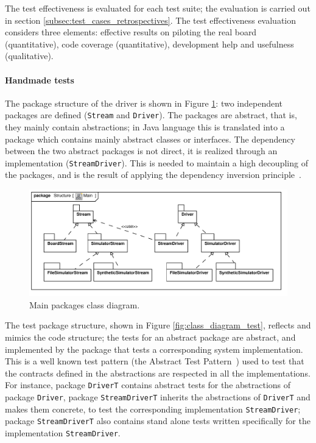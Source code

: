 \documentclass[english]{lni}
\newcommand{\lil}[1]{\texttt{\lstinline|#1|}}
\begin{document}
The test effectiveness is evaluated for each test suite; the evaluation is carried out in section \ref{subsec:test_cases_retrospectives}.
The test effectiveness evaluation considers three elements: effective results on piloting the real board (quantitative), code coverage
(quantitative), development help and usefulness (qualitative).

\paragraph*{Handmade tests}

The package structure of the driver is shown in Figure \ref{fig:class_diagram_main}: two independent packages are defined (\lil{Stream} and \lil{Driver}).  
The packages are abstract, that is, they mainly contain abstractions; in Java language this is translated into a package which contains mainly abstract classes or interfaces.  
The dependency between the two abstract packages is not direct, it is realized through an implementation (\lil{StreamDriver}).
This is needed to maintain a high decoupling of the packages, and is the result of applying the dependency inversion principle~\cite{Martin1996}.

\begin{figure}[htb!]
  \centering
  \includegraphics[scale=0.6]{UML_model/Class_Diagram__Structure__Main}
  \caption{Main packages class diagram.}
  \label{fig:class_diagram_main}
\end{figure}

The test package structure, shown in Figure \ref{fig:class_diagram_test}, reflects and mimics the code structure; the tests for an abstract package are abstract, and implemented by the package that tests a corresponding system implementation. 
This is a well known test pattern (the Abstract Test Pattern~\cite{Thomas2004}) used to test that the contracts defined in the abstractions are respected in all the implementations.  
For instance, package \lil{DriverT} contains abstract tests for the abstractions of package \lil{Driver}, package \lil{StreamDriverT} inherits the abstractions of \lil{DriverT} and makes them concrete, to test the corresponding implementation \lil{StreamDriver}; package \lil{StreamDriverT} also contains stand alone tests written specifically for the implementation \lil{StreamDriver}.
\end{document}
